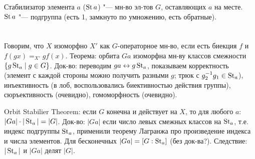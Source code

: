 Стабилизатор элемента $a$ ($\operatorname{St} a$) "--- мн-во эл-тов $G$, оставляющих $a$ на месте.
$\operatorname{St} a$ "--- подгруппа (есть 1, замкнуто по умножению, есть обратные).

\section{} %
Говорим, что $X$ изоморфно $X'$ как $G$-операторное мн-во, если
есть биекция $f$ и $f(gx)=_{X'}gf(x)$.
Теорема: орбита $Ga$ изоморфна мн-ву классов смежности $\{ g\operatorname{St}_a \mid g \in G \}$.
Док-во: переводим $ga \leftrightarrow g \operatorname{St}_a$, показываем корректность (элемент с каждой стороны можно получить
разными $g$; трюк с $g_2^{-1}g_1 \in \operatorname{St}_a$), инъективность (в лоб, воспользовались биективностью
действия группы), сюръективность (очевидно), гомоморфность (очевидно).

Orbit Stabilier Theorem: если $G$ конечна и действует на $X$, то для любого $a$:
$|Ga| \cdot |\operatorname{St}_a| = |G|$.
Док-во: $|Ga|$ если число левых смежных классов на $\operatorname{St}_a$, т.е. индекс подгруппы $\operatorname{St}_a$,
применили теорему Лагранжа про произведение индекса и числа элементов.
Для бесконечных $|Ga|=[G:\operatorname{St}_a]$ (\TODO без док-ва?).
Следствие: $|\operatorname{St}_a|$ и $|Ga|$ делят $|G|$.

\section{} %

\section{} %
